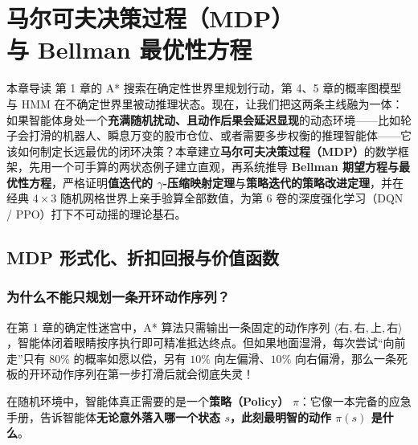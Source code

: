\chapter[马尔可夫决策过程与 Bellman 方程]{马尔可夫决策过程（MDP）\\与 Bellman 最优性方程}\label{ch:mdp}

\begin{chapIntro}{本章导读}
第 1 章的 A* 搜索在确定性世界里规划行动，第 4、5 章的概率图模型与 HMM 在不确定世界里被动推理状态。现在，让我们把这两条主线融为一体：如果智能体身处一个\textbf{充满随机扰动、且动作后果会延迟显现}的动态环境——比如轮子会打滑的机器人、瞬息万变的股市仓位、或者需要多步权衡的推理智能体——它该如何制定长远最优的闭环决策？本章建立\textbf{马尔可夫决策过程（MDP）}的数学框架，先用一个可手算的两状态例子建立直观，再系统推导 \textbf{Bellman 期望方程与最优性方程}，严格证明\textbf{值迭代的 $\gamma$-压缩映射定理}与\textbf{策略迭代的策略改进定理}，并在经典 $4\times 3$ 随机网格世界上亲手验算全部数值，为第 6 卷的深度强化学习（DQN / PPO）打下不可动摇的理论基石。
\end{chapIntro}

\section{MDP 形式化、折扣回报与价值函数}\label{sec:mdp-formulation}

\subsection{为什么不能只规划一条开环动作序列？}

在第 1 章的确定性迷宫中，A* 算法只需输出一条固定的动作序列 $\langle \text{右}, \text{右}, \text{上}, \text{右} \rangle$，智能体闭着眼睛按序执行即可精准抵达终点。但如果地面湿滑，每次尝试“向前走”只有 $80\%$ 的概率如愿以偿，另有 $10\%$ 向左偏滑、$10\%$ 向右偏滑，那么一条死板的开环动作序列在第一步打滑后就会彻底失灵！

在随机环境中，智能体真正需要的是一个\textbf{策略（Policy）} $\pi$：它像一本完备的应急手册，告诉智能体\textbf{无论意外落入哪一个状态 $s$，此刻最明智的动作 $\pi(s)$ 是什么}。


